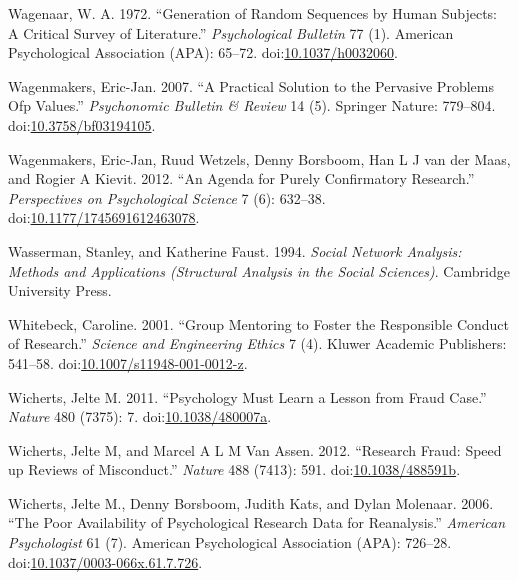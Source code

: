 \documentclass[a5paper]{book}
\begin{document}
\hypertarget{ref-doi:10.1037ux2fh0032060}{}
Wagenaar, W. A. 1972. ``Generation of Random Sequences by Human
Subjects: A Critical Survey of Literature.'' \emph{Psychological
Bulletin} 77 (1). American Psychological Association (APA): 65--72.
doi:\href{https://doi.org/10.1037/h0032060}{10.1037/h0032060}.

\hypertarget{ref-doi:10.3758ux2fbf03194105}{}
Wagenmakers, Eric-Jan. 2007. ``A Practical Solution to the Pervasive
Problems Ofp Values.'' \emph{Psychonomic Bulletin \& Review} 14 (5).
Springer Nature: 779--804.
doi:\href{https://doi.org/10.3758/bf03194105}{10.3758/bf03194105}.

\hypertarget{ref-doi:10.1177ux2f1745691612463078}{}
Wagenmakers, Eric-Jan, Ruud Wetzels, Denny Borsboom, Han L J van der
Maas, and Rogier A Kievit. 2012. ``An Agenda for Purely Confirmatory
Research.'' \emph{Perspectives on Psychological Science} 7 (6): 632--38.
doi:\href{https://doi.org/10.1177/1745691612463078}{10.1177/1745691612463078}.

\hypertarget{ref-isbn:9780521387071}{}
Wasserman, Stanley, and Katherine Faust. 1994. \emph{Social Network
Analysis: Methods and Applications (Structural Analysis in the Social
Sciences)}. Cambridge University Press.

\hypertarget{ref-doi:10.1007ux2fs11948-001-0012-z}{}
Whitebeck, Caroline. 2001. ``Group Mentoring to Foster the Responsible
Conduct of Research.'' \emph{Science and Engineering Ethics} 7 (4).
Kluwer Academic Publishers: 541--58.
doi:\href{https://doi.org/10.1007/s11948-001-0012-z}{10.1007/s11948-001-0012-z}.

\hypertarget{ref-doi:10.1038ux2f480007a}{}
Wicherts, Jelte M. 2011. ``Psychology Must Learn a Lesson from Fraud
Case.'' \emph{Nature} 480 (7375): 7.
doi:\href{https://doi.org/10.1038/480007a}{10.1038/480007a}.

\hypertarget{ref-doi:10.1038ux2f488591b}{}
Wicherts, Jelte M, and Marcel A L M Van Assen. 2012. ``Research Fraud:
Speed up Reviews of Misconduct.'' \emph{Nature} 488 (7413): 591.
doi:\href{https://doi.org/10.1038/488591b}{10.1038/488591b}.

\hypertarget{ref-doi:10.1037ux2f0003-066x.61.7.726}{}
Wicherts, Jelte M., Denny Borsboom, Judith Kats, and Dylan Molenaar.
2006. ``The Poor Availability of Psychological Research Data for
Reanalysis.'' \emph{American Psychologist} 61 (7). American
Psychological Association (APA): 726--28.
doi:\href{https://doi.org/10.1037/0003-066x.61.7.726}{10.1037/0003-066x.61.7.726}.
\end{document}
